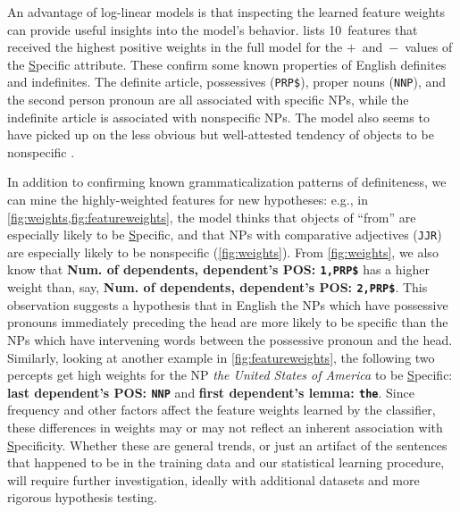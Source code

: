 \documentclass[11pt,letterpaper]{article}
\newcommand{\percept}[1]{{\sffamily\bfseries #1}}
\begin{document}
An advantage of log-linear models is that inspecting the learned feature weights can provide useful insights into the model's behavior.
 lists 10~features that received the highest positive weights in the full model 
for the \mbox{$+$ and $-$ values} of the \uline{S}pecific attribute. 
These confirm some known properties of English definites and indefinites. 
The definite article, possessives (\texttt{PRP\$}), proper nouns (\texttt{NNP}), and the second person pronoun 
are all associated with {specific} NPs, while the indefinite article is associated with nonspecific NPs.
The model also seems to have picked up on the less obvious but well-attested tendency 
of objects to be nonspecific \citep{aissen-03}.


In addition to confirming known grammaticalization patterns of definiteness, 
we can mine the highly-weighted features for new hypotheses: 
e.g., in \cref{fig:weights,fig:featureweights}, the model thinks that objects of ``from'' are especially likely to be \uline{S}pecific, and  that NPs with comparative adjectives (\texttt{JJR}) are especially likely to be nonspecific (\cref{fig:weights}). 
From \cref{fig:weights}, we also know that \percept{Num. of dependents, dependent's POS: \texttt{1,PRP\$}} has a higher weight than, 
say, \percept{Num. of dependents, dependent's POS: \texttt{2,PRP\$}}. 
This observation suggests a hypothesis that in English the NPs which have possessive pronouns immediately preceding the head 
are more likely to be specific than the NPs which have intervening words between the possessive pronoun and the head.
Similarly, looking at another example in \cref{fig:featureweights}, the following two percepts get high weights 
for the NP \emph{the United States of America} to be \uline{S}pecific: \percept{last dependent’s POS: \texttt{NNP}} 
and \percept{first dependent’s lemma: \texttt{the}}. 
Since frequency and other factors affect the feature weights learned by the classifier,
these differences in weights may or may not reflect an inherent association with \uline{S}pecificity.
Whether these are general trends, or just an artifact of the sentences that happened to be in the training data and our statistical learning procedure, 
will require further investigation, ideally with additional datasets and more rigorous hypothesis testing.
\end{document}
